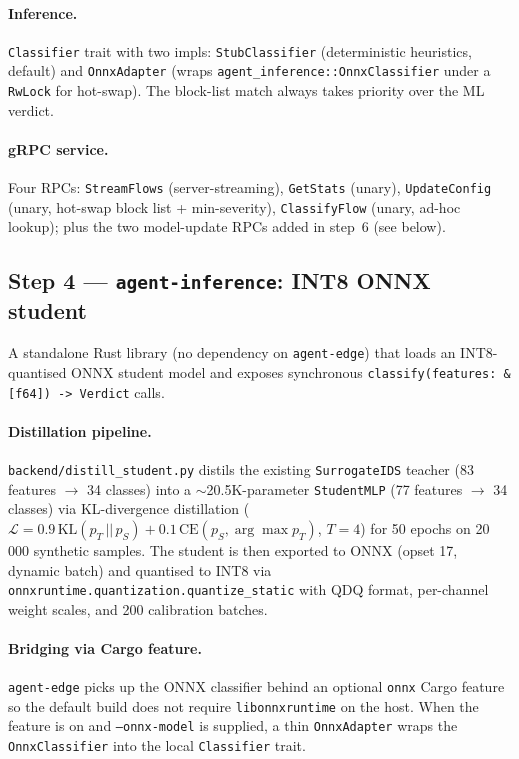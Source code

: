 \documentclass[11pt,a4paper]{article}
\begin{document}
\paragraph{Inference.}
\texttt{Classifier} trait with two impls: \texttt{StubClassifier}
(deterministic heuristics, default) and \texttt{OnnxAdapter}
(wraps \texttt{agent\_inference::OnnxClassifier} under a
\texttt{RwLock} for hot-swap).  The block-list match always takes
priority over the ML verdict.

\paragraph{gRPC service.}
Four RPCs: \texttt{StreamFlows} (server-streaming), \texttt{GetStats}
(unary), \texttt{UpdateConfig} (unary, hot-swap block list +
min-severity), \texttt{ClassifyFlow} (unary, ad-hoc lookup); plus the
two model-update RPCs added in step~6 (see below).

\subsection{Step 4 --- \texttt{agent-inference}: INT8 ONNX student}

A standalone Rust library (no dependency on \texttt{agent-edge}) that
loads an INT8-quantised ONNX student model and exposes synchronous
\texttt{classify(features: \&[f64]) -> Verdict} calls.

\paragraph{Distillation pipeline.}
\texttt{backend/distill\_student.py} distils the existing
\texttt{SurrogateIDS} teacher (83 features $\to$ 34 classes) into a
$\sim$20.5K-parameter \texttt{StudentMLP} (77 features $\to$ 34
classes) via KL-divergence distillation
(\(\mathcal{L} = 0.9 \, \mathrm{KL}(p_T \,||\, p_S) +
0.1 \, \mathrm{CE}(p_S, \arg\!\max p_T)\), \(T = 4\)) for 50 epochs
on 20\,000 synthetic samples.  The student is then exported to
ONNX (opset 17, dynamic batch) and quantised to INT8 via
\texttt{onnxruntime.quantization.quantize\_static} with QDQ format,
per-channel weight scales, and 200 calibration batches.

\paragraph{Bridging via Cargo feature.}
\texttt{agent-edge} picks up the ONNX classifier behind an
optional \texttt{onnx} Cargo feature so the default build does not
require \texttt{libonnxruntime} on the host.  When the feature is on
and \texttt{--onnx-model} is supplied, a thin
\texttt{OnnxAdapter} wraps the \texttt{OnnxClassifier} into the
local \texttt{Classifier} trait.
\end{document}
